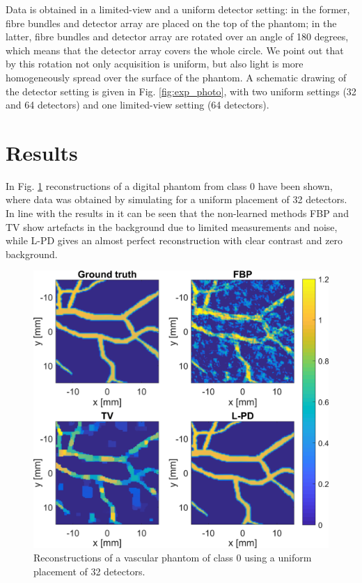 \documentclass[journal]{IEEEtran}
\begin{document}
Data is obtained in a limited-view and a uniform detector setting: in the former, fibre bundles and detector array are placed on the top of the phantom; in the latter, fibre bundles and detector array are rotated over an angle of 180 degrees, which means that the detector array covers the whole circle. We point out that by this rotation not only acquisition is uniform, but also light is more homogeneously spread over the surface of the phantom. A schematic drawing of the detector setting is given in Fig. \ref{fig:exp_photo}, with two uniform settings (32 and 64 detectors) and one limited-view setting (64 detectors).

\section{Results}\label{sec:results}
In Fig. \ref{fig:plain_result} reconstructions of a digital phantom from class 0 have been shown, where data was obtained by simulating for a uniform placement of 32 detectors. In line with the results in \cite{Adler2018} it can be seen that the non-learned methods FBP and TV show artefacts in the background due to limited measurements and noise, while L-PD gives an almost perfect reconstruction with clear contrast and zero background.

\begin{figure}[ht!]
\centering
\includegraphics[width=0.95\linewidth]{images/paper_plain_results.png}
\caption{Reconstructions of a vascular phantom of class 0 using a uniform placement of 32 detectors.}
\label{fig:plain_result}
\vspace{-3mm}
\end{figure}
\end{document}
